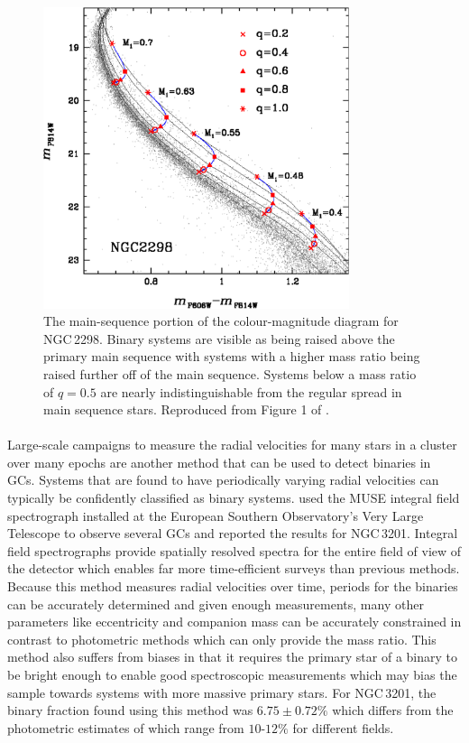 \begin{figure}
	\centering
	\includegraphics[width=0.8\textwidth]{./figures/main_sequence_binaries.pdf}
	\caption{The main-sequence portion of the colour-magnitude diagram for NGC\,2298. Binary
		systems are visible as being raised above the primary main sequence with systems
		with a higher mass ratio being raised further off of the main sequence. Systems
		below a mass ratio of $q=0.5$ are nearly indistinguishable from the regular spread
		in main sequence stars. Reproduced from Figure 1 of \citet{Milone2012}.}
	\label{fig:1/main_sequence_binaries}
\end{figure}

\paragraph{}
Large-scale campaigns to measure the radial velocities for many stars in a cluster over many epochs
are another method that can be used to detect binaries in GCs. Systems that are found to have
periodically varying radial velocities can typically be confidently classified as binary systems.
\citet{Giesers2019} used the MUSE integral field spectrograph installed at the European Southern
Observatory's Very Large Telescope to observe several GCs and reported the results for NGC\,3201.
Integral field spectrographs provide spatially resolved spectra for the entire field of view of the
detector which enables far more time-efficient surveys than previous methods. Because this method
measures radial velocities over time, periods for the binaries can be accurately determined and
given enough measurements, many other parameters like eccentricity and companion mass can be
accurately constrained in contrast to photometric methods which can only provide the mass ratio.
This method also suffers from biases in that it requires the primary star of a binary to be bright
enough to enable good spectroscopic measurements which may bias the sample towards systems with more
massive primary stars. For NGC\,3201, the binary fraction found using this method was $6.75 \pm 0.72
	\%$ \citep{Giesers2019} which differs from the photometric estimates of \citet{Milone2012} which
range from $10\textrm{-}12\%$ for different fields.


